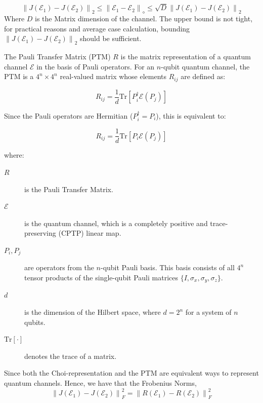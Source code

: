\documentclass[%
 reprint,
 amsmath,amssymb,
 aps,
]{revtex4-2}
\newcommand{\E}{\mathcal{E}}
\newcommand{\norm}[1]{\left\lVert#1\right\rVert}
\begin{document}
\begin{equation}
    \norm{J(\E_1)-J(\E_2)}_2\le \norm{\E_1-\E_2}_\diamond \le \sqrt{D}\norm{J(\E_1)-J(\E_2)}_2
\end{equation}
Where $D$ is the Matrix dimension of the channel. The upper bound is not tight, for practical reasons and average case calculation, bounding $\norm{J(\E_1)-J(\E_2)}_2$ should be sufficient.

The Pauli Transfer Matrix (PTM) $R$ is the matrix representation of a quantum channel $\mathcal{E}$ in the basis of Pauli operators. For an $n$-qubit quantum channel, the PTM is a $4^n \times 4^n$ real-valued matrix whose elements $R_{ij}$ are defined as:

\begin{equation}
    R_{ij} = \frac{1}{d} \mathrm{Tr}\left[ P_i^\dagger \mathcal{E}(P_j) \right]
\end{equation}

Since the Pauli operators are Hermitian ($P_i^\dagger = P_i$), this is equivalent to:

\begin{equation}
    R_{ij} = \frac{1}{d} \mathrm{Tr}\left[ P_i \mathcal{E}(P_j) \right]
\end{equation}

where:
\begin{description}
    \item[$R$] is the Pauli Transfer Matrix.
    \item[$\mathcal{E}$] is the quantum channel, which is a completely positive and trace-preserving (CPTP) linear map.
    \item[$P_i, P_j$] are operators from the $n$-qubit Pauli basis. This basis consists of all $4^n$ tensor products of the single-qubit Pauli matrices $\{I, \sigma_x, \sigma_y, \sigma_z\}$.
    \item[$d$] is the dimension of the Hilbert space, where $d=2^n$ for a system of $n$ qubits.
    \item[${\mathrm{Tr}[\cdot]}$] denotes the trace of a matrix.
\end{description}

Since both the Choi-representation and the PTM are equivalent ways to represent quantum channels. Hence, we have that the Frobenius Norms,
\begin{equation}
    \norm{J(\E_1)-J(\E_2)}_F^2=\norm{R(\E_1)-R(\E_2)}_F^2
\end{equation}
\end{document}
